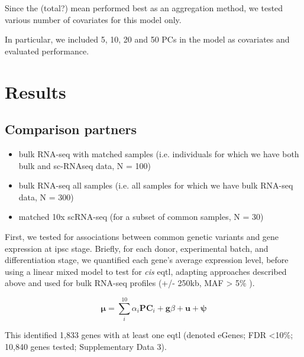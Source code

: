 Since the (total?) mean performed best as an aggregation method, we tested various number of covariates for this model only.

In particular, we included 5, 10, 20 and 50 PCs in the model as covariates and evaluated performance.

\section{Results}

\subsection{Comparison partners}

\begin{itemize}
    \item bulk RNA-seq with matched samples (i.e. individuals for which we have both bulk and sc-RNAseq data, N = 100)
    \item bulk RNA-seq all samples (i.e. all samples for which we have bulk RNA-seq data, N = 300)
    \item matched 10x scRNA-seq (for a subset of common samples, N = 30)
\end{itemize}


First, we tested for associations between common genetic variants and gene expression at \gls{ipsc} stage. 
Briefly, for each donor, experimental batch, and differentiation stage, we quantified each gene’s average expression level, before using a linear mixed model to test for \textit{cis} \gls{eqtl}, adapting approaches described above and used for bulk RNA-seq profiles (+/- 250kb, MAF > 5\% \cite{kilpinen2017common}). 

\begin{equation}
    \boldsymbol{\mu} = \sum_i^{10}\alpha_i \mathbf{PC}_i + \mathbf{g}\beta + \mathbf{u} + \boldsymbol{\psi}  
\end{equation}

This identified 1,833 genes with at least one \gls{eqtl} (denoted eGenes; FDR <10\%; 10,840 genes tested; Supplementary Data 3). 



